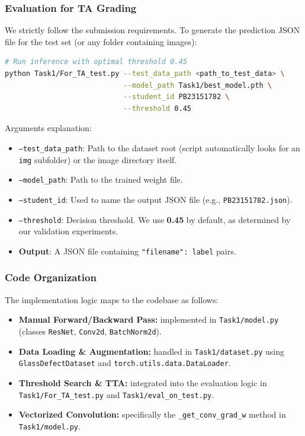 \subsubsection{Evaluation for TA Grading}
We strictly follow the submission requirements. To generate the prediction JSON file for the test set (or any folder containing images):
\begin{lstlisting}[language=bash]
# Run inference with optimal threshold 0.45
python Task1/For_TA_test.py --test_data_path <path_to_test_data> \
                            --model_path Task1/best_model.pth \
                            --student_id PB23151782 \
                            --threshold 0.45
\end{lstlisting}
Arguments explanation:
\begin{itemize}
    \item \texttt{--test\_data\_path}: Path to the dataset root (script automatically looks for an \texttt{img} subfolder) or the image directory itself.
    \item \texttt{--model\_path}: Path to the trained weight file.
    \item \texttt{--student\_id}: Used to name the output JSON file (e.g., \texttt{PB23151782.json}).
    \item \texttt{--threshold}: Decision threshold. We use \textbf{0.45} by default, as determined by our validation experiments.
    \item \textbf{Output}: A JSON file containing \texttt{"filename": label} pairs.
\end{itemize}

\subsubsection{Code Organization}
The implementation logic maps to the codebase as follows:
\begin{itemize}
    \item \textbf{Manual Forward/Backward Pass:} implemented in \texttt{Task1/model.py} (classes \texttt{ResNet}, \texttt{Conv2d}, \texttt{BatchNorm2d}).
    \item \textbf{Data Loading \& Augmentation:} handled in \texttt{Task1/dataset.py} using \texttt{GlassDefectDataset} and \texttt{torch.utils.data.DataLoader}.
    \item \textbf{Threshold Search \& TTA:} integrated into the evaluation logic in \texttt{Task1/For_TA_test.py} and \texttt{Task1/eval\_on\_test.py}.
    \item \textbf{Vectorized Convolution:} specifically the \texttt{\_get\_conv\_grad\_w} method in \texttt{Task1/model.py}.
\end{itemize}
